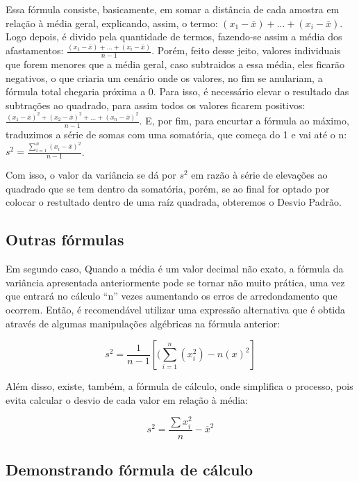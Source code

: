 Essa fórmula consiste, basicamente, em somar a distância de cada amostra em relação à média geral, explicando, assim, o termo: \((x_1 - \bar{x}) + ... + (x_i - \bar{x})\). Logo depois, é divido pela quantidade de termos, fazendo-se assim a média dos afastamentos:  \(\frac{(x_1 - \bar{x}) + ... + (x_i - \bar{x})}{n-1}\). Porém, feito desse jeito, valores individuais que forem menores que a média geral, caso subtraidos a essa média, eles ficarão negativos, o que criaria um cenário onde os valores, no fim se anulariam, a fórmula total chegaria próxima a 0. Para isso, é necessário elevar o resultado das subtrações ao quadrado, para assim todos os valores ficarem positivos: \(\frac{(x_1 - \bar{x})^2 + (x_2 - \bar{x})^2 + ... + (x_n - \bar{x})^2}{n - 1}\). E, por fim, para encurtar a fórmula ao máximo, traduzimos a série de somas com uma somatória, que começa do 1 e vai até o n: \(s^2 = \frac{\sum_{i=1}^n (x_i - \bar{x})^2}{n - 1}
\label{eq:variancia_somatorio}\).

Com isso, o valor da variância se dá por \(s^2\) em razão à série de elevações ao quadrado que se tem dentro da somatória, porém, se ao final for optado por colocar o restultado dentro de uma raíz quadrada, obteremos o Desvio Padrão.

\subsection{Outras fórmulas}
Em segundo caso, Quando a média é um valor decimal não exato, a fórmula da variância apresentada anteriormente pode se tornar não muito prática, uma vez que entrará no cálculo “n” vezes aumentando os erros de arredondamento que ocorrem. Então, é recomendável utilizar uma expressão alternativa que é obtida através de algumas manipulações algébricas na fórmula anterior:

\begin{equation}
    s^2 = \frac{1}{n-1}[(\sum_{i=1}^n (x_i^2) - n(x)^2]
    \label{eq:variancia_alternativa}
\end{equation}

Além disso, existe, também, a fórmula de cálculo, onde simplifica o processo, pois evita calcular o desvio de cada valor em relação à média:

\begin{equation}
    s^2 = \frac{\sum x_{i}^{2}}{n} - \overline{x}^{2}
\end{equation}

\subsection{Demonstrando fórmula de cálculo}

